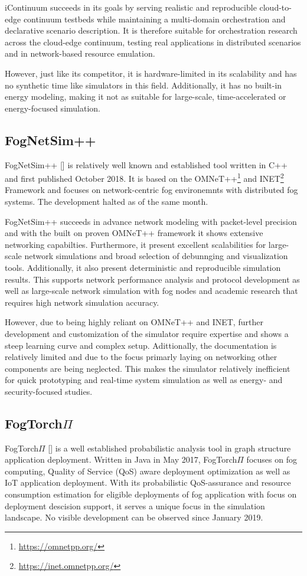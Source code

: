 iContinuum succeeds in its goals by serving realistic and reproducible cloud-to-edge continuum testbeds while maintaining a multi-domain orchestration and declarative scenario description.
It is therefore suitable for orchestration research across the cloud-edge continuum, testing real applications in distributed scenarios and in network-based resource emulation.

However, just like its competitor, it is hardware-limited in its scalability and has no synthetic time like simulators in this field.
Additionally, it has no built-in energy modeling, making it not as suitable for large-scale, time-accelerated or energy-focused simulation.

\subsection{FogNetSim++}\label{sec:FogNetSim++}
FogNetSim++ [\cite{sim-fognetsim++}] is relatively well known and established tool written in C++ and first published October 2018.
It is based on the OMNeT++\footnote{\url{https://omnetpp.org/}} and INET\footnote{\url{https://inet.omnetpp.org/}} Framework and focuses on network-centric fog environemnts with distributed fog systems.
The development halted as of the same month.

FogNetSim++ succeeds in advance network modeling with packet-level precision and with the built on proven OMNeT++ framework it shows extensive networking capabilties.
Furthermore, it present excellent scalabilities for large-scale network simulations and broad selection of debunnging and visualization tools.
Additionally, it also present deterministic and reproducible simulation results.
This supports network performance analysis and protocol development as well as large-scale network simulation with fog nodes and academic research that requires high network simulation accuracy.

However, due to being highly reliant on OMNeT++ and INET, further development and customization of the simulator require expertise and shows a steep learning curve and complex setup.
Adittionally, the documentation is relatively limited and due to the focus primarly laying on networking other components are being neglected.
This makes the simulator relatively inefficient for quick prototyping and real-time system simulation as well as energy- and security-focused studies.

\subsection{FogTorch$\Pi$}\label{sec:FogTorchPi}
FogTorch$\Pi$ [\cite{sim-fogtorchpi}] is a well established probabilistic analysis tool in graph structure application deployment.
Written in Java in May 2017, FogTorch$\Pi$ focuses on fog computing, Quality of Service (QoS) aware deployment optimization as well as IoT application deployment.
With its probabilistic QoS-assurance and resource consumption estimation for eligible deployments of fog application with focus on deployment descision support, it serves a unique focus in the simulation landscape.
No visible development can be observed since January 2019.

